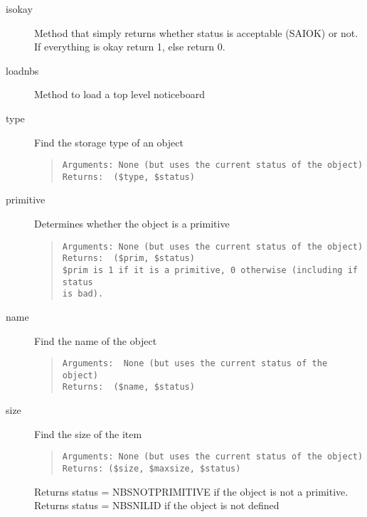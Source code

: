 \documentclass[twoside,11pt]{article}
\newenvironment{myquote}{\begin{quote}\begin{small}}{\end{small}\end{quote}}
\renewcommand{\_}{\texttt{\symbol{95}}}
\begin{document}
\begin{description}

\item[isokay] \mbox{}

Method that simply returns whether status is acceptable (SAI\_{}\_{}OK)
or not. If everything is okay return 1, else return 0.

\item[loadnbs] \mbox{}

Method to load a top level noticeboard

\item[type] \mbox{}

Find the storage type of an object
\begin{myquote}
\begin{verbatim}
Arguments: None (but uses the current status of the object)
Returns:  ($type, $status)
\end{verbatim}
\end{myquote}

\item[primitive] \mbox{}

Determines whether the object is a primitive
\begin{myquote}
\begin{verbatim}
Arguments: None (but uses the current status of the object)
Returns:  ($prim, $status)
$prim is 1 if it is a primitive, 0 otherwise (including if status
is bad).
\end{verbatim}
\end{myquote} %

\item[name] \mbox{}

Find the name of the object
\begin{myquote}
\begin{verbatim}
Arguments:  None (but uses the current status of the object)
Returns:  ($name, $status)
\end{verbatim}
\end{myquote}

\item[size] \mbox{}

Find the size of the item
\begin{myquote}
\begin{verbatim}
Arguments: None (but uses the current status of the object)
Returns: ($size, $maxsize, $status)
\end{verbatim}
\end{myquote} %

Returns status = NBS\_{}\_{}NOTPRIMITIVE if the object is not a primitive.
Returns status = NBS\_{}\_{}NILID  if the object is not defined


\end{description}
\end{document}

